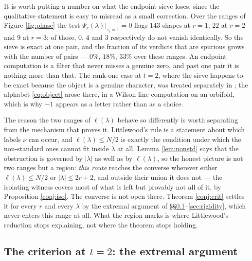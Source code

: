 \documentclass[11pt,reqno]{amsart}
\theoremstyle{plain}
\theoremstyle{definition}
\begin{document}
It is worth putting a number on what the endpoint sieve loses, since the qualitative statement is
easy to misread as a small correction. Over the ranges of Figure \ref{fig:phase} the test
$\Psi_r(\lambda)|_{z_i=1}=0$ flags $143$ shapes at $r=1$, $22$ at $r=2$ and $9$ at $r=3$; of those,
$0$, $4$ and $3$ respectively do not vanish identically. So the sieve is exact at one pair, and the
fraction of its verdicts that are spurious grows with the number of pairs --- $0\%$, $18\%$, $33\%$
over these ranges. An endpoint computation is a filter that never misses a genuine zero, and past one
pair it is nothing more than that. The rank-one case at $t=2$, where the sieve happens to be exact
because the object is a genuine character, was treated separately in \cite{Mar26}; the alphabet
\eqref{eq:object} arose there, in a Wilson-line computation on an orbifold, which is why $-1$ appears
as a letter rather than as a choice.

The reason the two ranges of $\ell(\lambda)$ behave so differently is worth separating from the
mechanism that proves it. Littlewood's rule is a statement about which labels $\nu$ can occur, and
$\ell(\lambda)\le N/2$ is exactly the condition under which the non-standard ones cannot fit inside
$\lambda$ at all. Lemma \ref{lem:nonstd} says that the obstruction is governed by $|\lambda|$ as well
as by $\ell(\lambda)$, so the honest picture is not two ranges but a region: \emph{this route}
reaches the converse wherever either $\ell(\lambda)\le N/2$ or $|\lambda|\le2r+2$, and outside their
union it does not --- the isolating witness covers most of what is left but provably not all of it,
by Proposition \ref{conj:iso}. The converse is not open there. Theorem \ref{conj:crit} settles it
for every $r$ and every $\lambda$ by the extremal argument of
\S\S\ref{sec:extremal}--\ref{sec:rigidity}, which never enters this range at all. What the region
marks is where Littlewood's reduction stops explaining, not where the theorem stops holding.

\subsection{The criterion at \texorpdfstring{$t=2$}{t=2}: the extremal argument}\label{sec:extremal}
\end{document}
